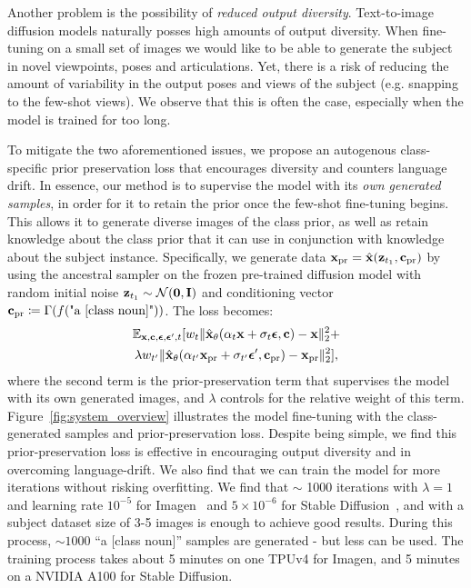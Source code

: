 Another problem is the possibility of \textit{reduced output diversity}. Text-to-image diffusion models naturally posses high amounts of output diversity. When fine-tuning on a small set of images we would like to be able to generate the subject in novel viewpoints, poses and articulations. Yet, there is a risk of reducing the amount of variability in the output poses and views of the subject (e.g. snapping to the few-shot views). We observe that this is often the case, especially when the model is trained for too long.

To mitigate the two aforementioned issues, we propose an autogenous class-specific prior preservation loss that encourages diversity and counters language drift. In essence, our method is to supervise the model with its \textit{own generated samples}, in order for it to retain the prior once the few-shot fine-tuning begins. This allows it to generate diverse images of the class prior, as well as retain knowledge about the class prior that it can use in conjunction with knowledge about the subject instance. Specifically, we generate data $\mathbf{x}_\text{pr}=\hat{\mathbf{x}}(\mathbf{z}_{t_1}, \mathbf{c}_\text{pr})$ by using the ancestral sampler on the frozen pre-trained diffusion model with random initial noise $\mathbf{z}_{t_1} \sim \mathcal{N}(\mathbf{0}, \mathbf{I})$ and conditioning vector $\mathbf{c}_\text{pr} \coloneqq \Gamma(f(\text{"a [class noun]"}))$. The loss becomes:
\begin{multline}
\label{eq:prior_pres}
    \mathbb{E}_{\mathbf{x},\mathbf{c},{\boldsymbol{\epsilon}},{\boldsymbol{\epsilon}}^\prime,t}[w_t \|\hat{\mathbf{x}}_\theta(\alpha_t \mathbf{x} + \sigma_t {\boldsymbol{\epsilon}}, \mathbf{c}) - \mathbf{x} \|^2_2 + \\
    \lambda w_{t^\prime} \|\hat{\mathbf{x}}_\theta(\alpha_{t^\prime} \mathbf{x}_\text{pr} + \sigma_{t^\prime} {\boldsymbol{\epsilon}}^\prime, \mathbf{c}_\text{pr}) - \mathbf{x}_\text{pr} \|^2_2],
\end{multline}
where the second term is the prior-preservation term that supervises the model with its own generated images, and $\lambda$ controls for the relative weight of this term. Figure~\ref{fig:system_overview} illustrates the model fine-tuning with the class-generated samples and prior-preservation loss. 
Despite being simple, we find this prior-preservation loss is effective in encouraging output diversity and  in overcoming language-drift. We also find that we can train the model for more iterations without risking overfitting. We find that \(\sim \) 1000 iterations with $\lambda = 1$ and learning rate $10^{-5}$ for Imagen~\cite{saharia2022photorealistic} and $5 \times 10^{-6}$ for Stable Diffusion~\cite{rombach2022high}, and with a subject dataset size of 3-5 images is enough to achieve good results. During this process, $\sim 1000$ ``a [class noun]'' samples are generated - but less can be used. The training process takes about 5 minutes on one TPUv4 for Imagen, and 5 minutes on a NVIDIA A100 for Stable Diffusion.